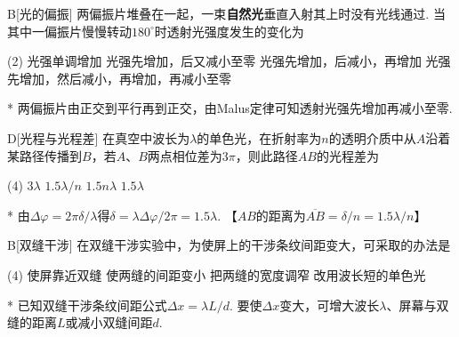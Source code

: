 \begin{choice}{B}[光的偏振]
    两偏振片堆叠在一起，一束\textbf{自然光}垂直入射其上时没有光线通过. 当其中一偏振片慢慢转动$180^{\circ}$时透射光强度发生的变化为
    \begin{tasks}(2)
        \task 光强单调增加
        \task 光强先增加，后又减小至零
        \task 光强先增加，后减小，再增加
        \task 光强先增加，然后减小，再增加，再减小至零
    \end{tasks}
\end{choice}
\begin{solution}*
    两偏振片由正交到平行再到正交，由Malus定律可知透射光强先增加再减小至零. 
\end{solution}

\begin{choice}{D}[光程与光程差]
    在真空中波长为$\lambda$的单色光，在折射率为$n$的透明介质中从$A$沿着某路径传播到$B$，若$A$、$B$两点相位差为$3\pi$，则此路径$AB$的光程差为
    \begin{tasks}(4)
        \task $3\lambda$
        \task $1.5\lambda/n$
        \task $1.5n\lambda$
        \task $1.5\lambda$
    \end{tasks}
\end{choice}
\begin{solution}*
    由$\Delta\varphi=2\pi\delta/\lambda$得$\delta=\lambda\Delta\varphi/2\pi=1.5\lambda$. \hfill【$AB$的距离为$\overline{AB}=\delta/n=1.5\lambda/n$】
\end{solution}

\begin{choice}{B}[双缝干涉]
    在双缝干涉实验中，为使屏上的干涉条纹间距变大，可采取的办法是
    \begin{tasks}(4)
        \task 使屏靠近双缝
        \task 使两缝的间距变小
        \task 把两缝的宽度调窄
        \task 改用波长短的单色光
    \end{tasks}
\end{choice}
\begin{solution}*
    已知双缝干涉条纹间距公式$\Delta x=\lambda L/d$. 要使$\Delta x$变大，可增大波长$\lambda$、屏幕与双缝的距离$L$或减小双缝间距$d$. 
\end{solution}

